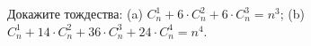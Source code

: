 Докажите тождества: (a) $C_n^1 + 6 \cdot C_n^2 + 6 \cdot C_n^3 = n^3$; \medskip (b) $C_n^1 + 14 \cdot C_n^2 + 36 \cdot C_n^3 + 24 \cdot C_n^4 = n^4$.